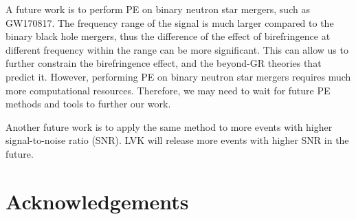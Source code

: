 \documentclass[reprint,amsmath,amssymb,aps,twocolumn]{aastex631}
\begin{document}




A future work is to perform PE on binary neutron star mergers, such as GW170817.
The frequency range of the signal is much larger compared to the binary black hole mergers, thus the difference of the effect of birefringence at different frequency within the range can be more significant.
This can allow us to further constrain the birefringence effect, and the beyond-GR theories that predict it.
However, performing PE on binary neutron star mergers requires much more computational resources.
Therefore, we may need to wait for future PE methods and tools to further our work.

Another future work is to apply the same method to more events with higher signal-to-noise ratio (SNR).
LVK will release more events with higher SNR in the future.

\section{Acknowledgements}
\label{sec:Acknowledgements}




\end{document}
